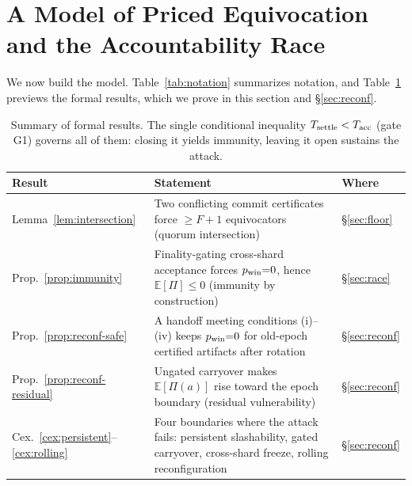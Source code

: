 \section{A Model of Priced Equivocation and the Accountability Race}
\label{sec:design}

We now build the model. Table~\ref{tab:notation} summarizes notation, and Table~\ref{tab:results}
previews the formal results, which we prove in this section and \S\ref{sec:reconf}.

\begin{table}[t]
\centering
\caption{Summary of formal results. The single conditional inequality $T_{\mathrm{settle}}<T_{\mathrm{acc}}$ (gate G1)
governs all of them: closing it yields immunity, leaving it open sustains the attack.}
\label{tab:results}
\small
\begin{tabularx}{\linewidth}{@{}l X l@{}}
\toprule
Result & Statement & Where \\
\midrule
Lemma~\ref{lem:intersection} & Two conflicting commit certificates force $\ge F{+}1$ equivocators
(quorum intersection) & \S\ref{sec:floor} \\
Prop.~\ref{prop:immunity} & Finality-gating cross-shard acceptance forces $p_{\mathrm{win}}{=}0$, hence
$\mathbb{E}[\Pi]\le0$ (immunity by construction) & \S\ref{sec:race} \\
Prop.~\ref{prop:reconf-safe} & A handoff meeting conditions (i)--(iv) keeps $p_{\mathrm{win}}{=}0$ for old-epoch
certified artifacts after rotation & \S\ref{sec:reconf} \\
Prop.~\ref{prop:reconf-residual} & Ungated carryover makes $\mathbb{E}[\Pi(a)]$ rise toward the
epoch boundary (residual vulnerability) & \S\ref{sec:reconf} \\
Cex.~\ref{cex:persistent}--\ref{cex:rolling} & Four boundaries where the attack fails: persistent
slashability, gated carryover, cross-shard freeze, rolling reconfiguration & \S\ref{sec:reconf} \\
\bottomrule
\end{tabularx}
\end{table}

